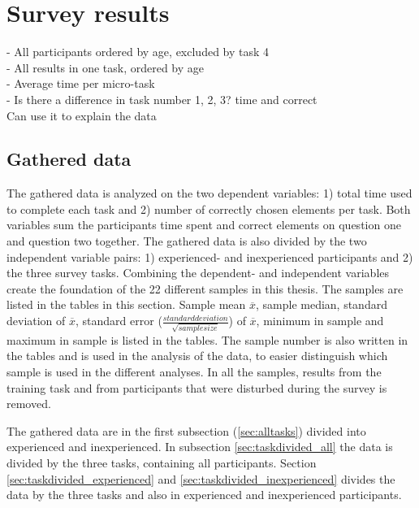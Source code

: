 \section{Survey results}\label{sec:survey_results}

- All participants ordered by age, excluded by task 4 \\
- All results in one task, ordered by age \\ 
- Average time per micro-task \\
- Is there a difference in task number 1, 2, 3? time and correct  \\
Can use it to explain the data

\subsection{Gathered data}\label{sec:gathereddata}
The gathered data is analyzed on the two dependent variables: 1) total time used to complete each task and 2) number of correctly chosen elements per task. Both variables sum the participants time spent and correct elements on question one and question two together. The gathered data is also divided by the two independent variable pairs: 1) experienced- and inexperienced participants and 2) the three survey tasks. Combining the dependent- and independent variables create the foundation of the 22 different samples in this thesis. The samples are listed in the tables in this section. Sample mean $\overline{x}$, sample median, standard deviation of $\overline{x}$, standard error ($\frac{standard deviation}{\sqrt{sample size}}$) of $\overline{x}$, minimum in sample and maximum in sample is listed in the tables. The sample number is also written in the tables and is used in the analysis of the data, to easier distinguish which sample is used in the different analyses. In all the samples, results from the training task and from participants that were disturbed during the survey is removed.

The gathered data are in the first subsection (\ref{sec:alltasks}) divided into experienced and inexperienced. In subsection \ref{sec:taskdivided_all} the data is divided by the three tasks, containing all participants. Section \ref{sec:taskdivided_experienced}  and \ref{sec:taskdivided_inexperienced} divides the data by the three tasks and also in experienced and inexperienced participants. 

